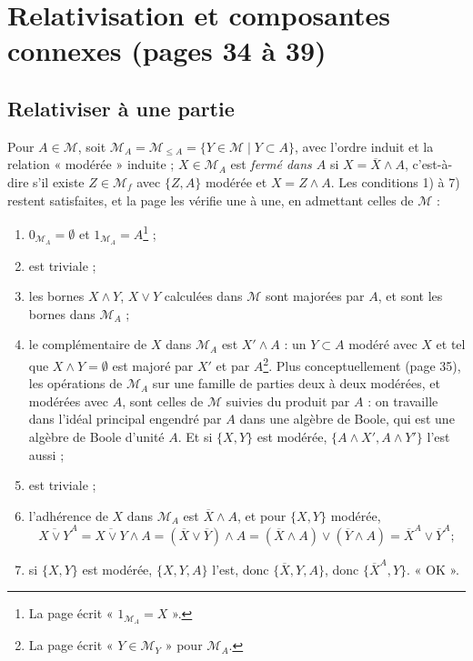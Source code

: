 \documentclass[11pt,a4paper]{article}
\begin{document}
\section*{Relativisation et composantes connexes (pages 34 à 39)}

\subsection*{Relativiser à une partie}

Pour $A \in \mathcal{M}$, soit $\mathcal{M}_{A} = \mathcal{M}_{\leq A} = \{Y
\in \mathcal{M} \mid Y \subset A\}$, avec l'ordre induit et la relation
« modérée » induite ; $X \in \mathcal{M}_{A}$ est \emph{fermé dans $A$} si $X =
\overline{X} \wedge A$, c'est-à-dire s'il existe $Z \in \mathcal{M}_{f}$ avec
$\{Z, A\}$ modérée et $X = Z \wedge A$. Les conditions 1) à 7) restent
satisfaites, et la page les vérifie une à une, en admettant celles de
$\mathcal{M}$ :
\begin{enumerate}
\item[1)] $0_{\mathcal{M}_{A}} = \emptyset$ et $1_{\mathcal{M}_{A}} =
A$\footnote{La page écrit « $1_{\mathcal{M}_{A}} = X$ ».} ;
\item[2)] est triviale ;
\item[3)] les bornes $X \wedge Y$, $X \vee Y$ calculées dans $\mathcal{M}$ sont
majorées par $A$, et sont les bornes dans $\mathcal{M}_{A}$ ;
\item[4)] le complémentaire de $X$ dans $\mathcal{M}_{A}$ est $X' \wedge A$ :
un $Y \subset A$ modéré avec $X$ et tel que $X \wedge Y = \emptyset$ est majoré
par $X'$ et par $A$\footnote{La page écrit « $Y \in \mathcal{M}_{Y}$ » pour
$\mathcal{M}_{A}$.}. Plus conceptuellement (page 35), les opérations de
$\mathcal{M}_{A}$ sur une famille de parties deux à deux modérées, et modérées
avec $A$, sont celles de $\mathcal{M}$ suivies du produit par $A$ : on travaille
dans l'idéal principal engendré par $A$ dans une algèbre de Boole, qui est une
algèbre de Boole d'unité $A$. Et si $\{X,Y\}$ est modérée, $\{A \wedge X', A
\wedge Y'\}$ l'est aussi ;
\item[5)] est triviale ;
\item[6)] l'adhérence de $X$ dans $\mathcal{M}_{A}$ est $\overline{X} \wedge A$,
et pour $\{X,Y\}$ modérée,
\[
\overline{X \vee Y}^{A} = \overline{X \vee Y} \wedge A = (\overline{X} \vee
\overline{Y}) \wedge A = (\overline{X} \wedge A) \vee (\overline{Y} \wedge A) =
\overline{X}^{A} \vee \overline{Y}^{A} ;
\]
\item[7)] si $\{X,Y\}$ est modérée, $\{X, Y, A\}$ l'est, donc $\{\overline{X},
Y, A\}$, donc $\{\overline{X}^{A}, Y\}$. « OK ».
\end{enumerate}
\end{document}
